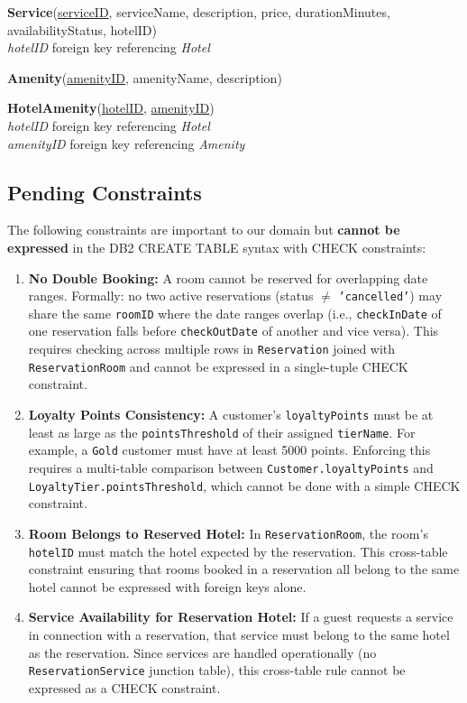 \documentclass[12pt,letterpaper]{article}
\begin{document}
\textbf{Service}(\underline{serviceID}, serviceName, description, price, durationMinutes, availabilityStatus, hotelID)\\
\textit{hotelID} foreign key referencing \textit{Hotel}

\textbf{Amenity}(\underline{amenityID}, amenityName, description)

\textbf{HotelAmenity}(\underline{hotelID}, \underline{amenityID})\\
\textit{hotelID} foreign key referencing \textit{Hotel}\\
\textit{amenityID} foreign key referencing \textit{Amenity}

\subsection*{Pending Constraints}

The following constraints are important to our domain but \textbf{cannot be expressed} in the DB2 CREATE TABLE syntax with CHECK constraints:

\begin{enumerate}
    \item \textbf{No Double Booking:} A room cannot be reserved for overlapping date ranges. Formally: no two active reservations (status $\neq$ \texttt{'cancelled'}) may share the same \texttt{roomID} where the date ranges overlap (i.e., \texttt{checkInDate} of one reservation falls before \texttt{checkOutDate} of another and vice versa). This requires checking across multiple rows in \texttt{Reservation} joined with \texttt{ReservationRoom} and cannot be expressed in a single-tuple CHECK constraint.

    \item \textbf{Loyalty Points Consistency:} A customer's \texttt{loyaltyPoints} must be at least as large as the \texttt{pointsThreshold} of their assigned \texttt{tierName}. For example, a \texttt{Gold} customer must have at least 5000 points. Enforcing this requires a multi-table comparison between \texttt{Customer.loyaltyPoints} and \texttt{LoyaltyTier.pointsThreshold}, which cannot be done with a simple CHECK constraint.

    \item \textbf{Room Belongs to Reserved Hotel:} In \texttt{ReservationRoom}, the room's \texttt{hotelID} must match the hotel expected by the reservation. This cross-table constraint ensuring that rooms booked in a reservation all belong to the same hotel cannot be expressed with foreign keys alone.

    \item \textbf{Service Availability for Reservation Hotel:} If a guest requests a service in connection with a reservation, that service must belong to the same hotel as the reservation. Since services are handled operationally (no \texttt{ReservationService} junction table), this cross-table rule cannot be expressed as a CHECK constraint.
\end{enumerate}
\end{document}
